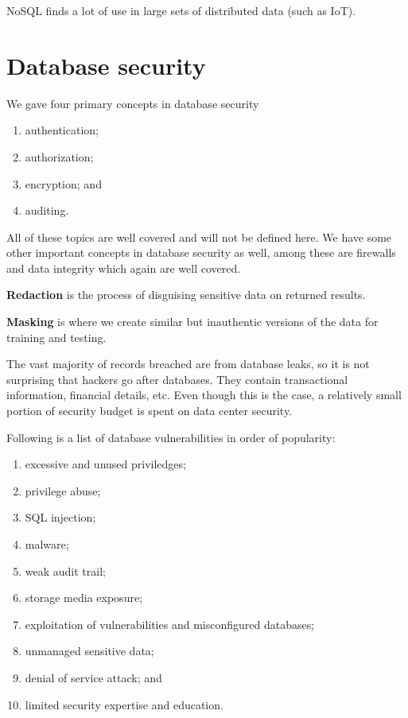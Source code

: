 NoSQL finds a lot of use in large sets of distributed data (such as IoT).

\section{Database security}

We gave four primary concepts in database security
\begin{enumerate}
    \item authentication;
    \item authorization;
    \item encryption; and
    \item auditing.
\end{enumerate}

All of these topics are well covered and will not be defined here. We have some other important concepts in database security as well, among these are firewalls and data integrity which again are well covered.

\begin{definition}[Redaction]
    \textbf{Redaction} is the process of disguising sensitive data on returned results.
\end{definition}

\begin{definition}[Masking]
    \textbf{Masking} is where we create similar but inauthentic versions of the data for training and testing.
\end{definition}

\begin{remark}
    The vast majority of records breached are from database leaks, so it is not surprising that hackers go after databases. They contain transactional information, financial details, etc. Even though this is the case, a relatively small portion of security budget is spent on data center security.
\end{remark}

Following is a list of database vulnerabilities in order of popularity:
\begin{enumerate}
    \item excessive and unused priviledges;
    \item privilege abuse;
    \item SQL injection;
    \item malware;
    \item weak audit trail;
    \item storage media exposure;
    \item exploitation of vulnerabilities and misconfigured databases;
    \item unmanaged sensitive data;
    \item denial of service attack; and
    \item limited security expertise and education.
\end{enumerate}


